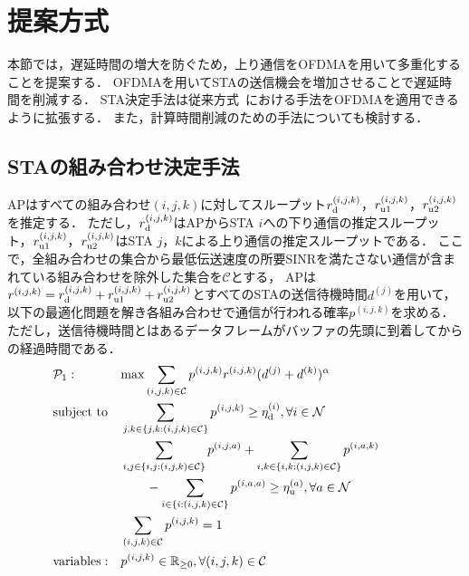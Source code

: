 \documentclass[technicalreport]{ieicej}
\newcommand{\sij}{(i,j)}
\newcommand{\sijk}{(i,j,k)}
\newcommand{\rijk}{r^{(i,j,k)}}
\newcommand{\mthc}{\mathcal C}
\def\coloneqq{\mathrel{\mathop:}=}
\begin{document}
\section{提案方式}\label{sec:propose}
	本節では，遅延時間の増大を防ぐため，上り通信をOFDMAを用いて多重化することを提案する．
	OFDMAを用いてSTAの送信機会を増加させることで遅延時間を削減する．
	STA決定手法は従来方式~\cite{promac_fair}における手法をOFDMAを適用できるように拡張する．
	また，計算時間削減のための手法についても検討する．
	\subsection{STAの組み合わせ決定手法}\label{sec:opt}
		APはすべての組み合わせ$(i,j,k)$に対してスループット$r^{(i,j,k)}_{\rm d}$，$r^{(i,j,k)}_{\rm u1}$，$r^{(i,j,k)}_{\rm u2}$を推定する．
		ただし，$r^{(i,j,k)}_{\rm d}$はAPからSTA $i$への下り通信の推定スループット，$r^{(i,j,k)}_{\rm u1}$，$r^{(i,j,k)}_{\rm u2}$はSTA $j$，$k$による上り通信の推定スループットである．
		ここで，全組み合わせの集合から最低伝送速度の所要SINRを満たさない通信が含まれている組み合わせを除外した集合を$\mthc$とする，
		APは$\rijk=r^{(i,j,k)}_{\rm d}+r^{(i,j,k)}_{\rm u1}+r^{(i,j,k)}_{\rm u2}$とすべてのSTAの送信待機時間$d^{(j)}$を用いて，以下の最適化問題を解き各組み合わせで通信が行われる確率$p^{(i,j,k)}$を求める．
		ただし，送信待機時間とはあるデータフレームがバッファの先頭に到着してからの経過時間である．
		\begin{align}
			&{\mathcal P}_1: && {\rm max} \sum_{(i,j,k)\in{\mathcal C}} p^{(i,j,k)}r^{(i,j,k)}(d^{(j)}+d^{(k)})^{\alpha} &&&&&&\\
			&{\rm subject\ to} && \sum_{j,k\in\{j,k:(i,j,k)\in{\mathcal C}\}} p^{(i,j,k)} \geq \eta_{\rm d}^{(i)}, \forall i\in {\mathcal N} \label{eq:etad} \\
			&&& \sum_{i,j\in\{i,j:(i,j,k)\in{\mathcal C}\}} p^{(i,j,a)} +\sum_{i,k\in\{i,k:(i,j,k)\in{\mathcal C}\}} p^{(i,a,k)} \nonumber\\
			&&&\qquad- \sum_{i\in\{i:(i,j,k)\in{\mathcal C}\}} p^{(i,a,a)} \geq \eta_{\rm u}^{(a)}, \forall a\in {\mathcal N} \label{eq:etau} \\
			&&& \sum_{(i,j,k)\in{\mathcal C}} p^{(i,j,k)}=1 \\
			&{\rm variables:} &&p^{(i,j,k)} \in {\mathbb R}_{\geq 0},\forall(i,j,k)\in {\mathcal C}
		\end{align}
\end{document}
